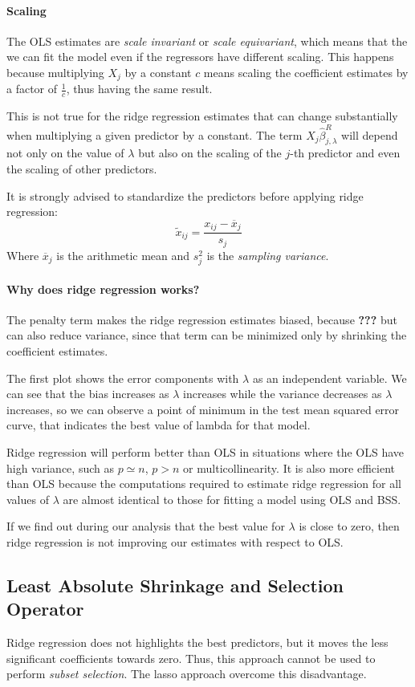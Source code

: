 \paragraph*{Scaling}
The OLS estimates are \textit{scale invariant} or \textit{scale equivariant}, which means that the we can fit the model even if the regressors have different scaling. This happens because multiplying $X_j$ by a constant $c$ means scaling the coefficient estimates by a factor of $\frac{1}{c}$, thus having the same result.

This is not true for the ridge regression estimates that can change substantially when multiplying a given predictor by a constant. The term $X_j \hat{\beta}_{j,\lambda}^R$ will depend not only on the value of $\lambda$ but also on the scaling of the $j$-th predictor and even the scaling of other predictors.

It is strongly advised to standardize the predictors before applying ridge regression:
\[
    \tilde{x}_{ij} = \frac{x_{ij} - \overline{x}_j}{s_j}
\]
Where $\overline{x}_j$ is the arithmetic mean and $s_j^2$ is the \textit{sampling variance}.

\paragraph*{Why does ridge regression works?}
The penalty term makes the ridge regression estimates biased, because \textbf{???} but can also reduce variance, since that term can be minimized only by
shrinking the coefficient estimates.

The first plot shows the error components with $\lambda$ as an independent variable. We can see that the bias increases as $\lambda$ increases while the variance decreases as $\lambda$ increases, so we can observe a point of minimum in the test mean squared error curve, that indicates the best value of lambda for that model.

Ridge regression will perform better than OLS in situations where the OLS have high variance, such as $p \simeq n$, $p > n$ or multicollinearity. It is also more efficient than OLS because the computations required to estimate ridge regression for all values of $\lambda$ are almost identical to those for fitting a model using OLS and BSS.

If we find out during our analysis that the best value for $\lambda$ is close to zero, then ridge regression is not improving our estimates with respect to OLS.

\subsection*{Least Absolute Shrinkage and Selection Operator}
Ridge regression does not highlights the best predictors, but it moves the less significant coefficients towards zero. Thus, this approach cannot be used to perform \textit{subset selection}. The lasso approach overcome this disadvantage.


